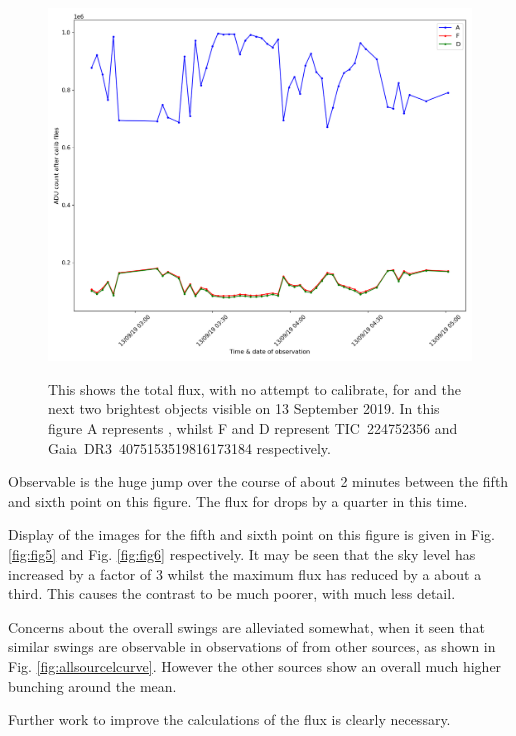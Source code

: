 \begin{figure}[!htbp]
\begin{center}
\includegraphics[scale=0.40]{images/all130919.png} \\
\end{center}
\caption{This shows the total flux, with no attempt to calibrate, for {\ross}
and the next two brightest objects visible on 13 September 2019. In this figure
A represents \ross, whilst F and D represent TIC~224752356 and
Gaia~DR3~4075153519816173184 respectively.}\protect\label{fig:2019sept13}
\end{figure}

Observable is the huge jump over the course of about 2 minutes between the
fifth and sixth point on this figure. The flux for {\ross} drops by a quarter in
this time.

Display of the images for the fifth and sixth point on this figure is given in
Fig. \ref{fig:fig5} and Fig. \ref{fig:fig6} respectively. It may be seen that
the sky level has increased by a factor of 3 whilst the maximum flux has reduced
by a about a third. This causes the contrast to be much poorer, with much less
detail.

Concerns about the overall swings are alleviated somewhat, when it seen that
similar swings are observable in observations of {\ross} from other sources, as
shown in Fig. \ref{fig:allsourcelcurve}. However the other sources show an
overall much higher bunching around the mean.

Further work to improve the calculations of the flux is clearly necessary.

